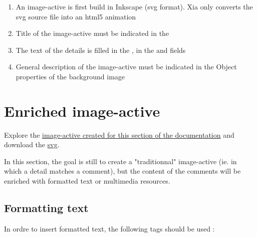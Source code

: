 \begin{enumerate}
 \item An image-active is first build in Inkscape (svg format). Xia only 
 converts the svg source file into an html5 animation
 \item Title of the image-active must be indicated in the 
 \item The text of the details is filled in the , 
 in the  and  fields
 \item General description of the image-active must be indicated in the \chemin
{Object properties} of the background image
\end{enumerate}

\section{Enriched image-active}

Explore the \href{http://geoffrey-gekiere.ac-versailles.fr/xia2}{image-active 
created for this section of the documentation} and download the 
\href{http://geoffrey-gekiere.ac-versailles.fr/xia2/svg/xia2.svg}{svg}.

In this section, the goal is still to create a "traditionnal" image-active 
(ie. in which a detail matches a comment), but the content of the comments 
will be enriched with  formatted text or multimedia resources.

\subsection{Formatting text}

In ordre to insert formatted text, the following tags should be used :

